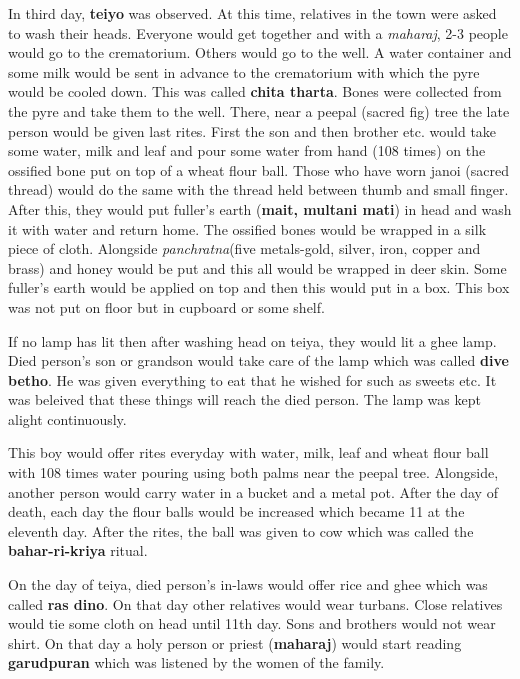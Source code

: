 In third day, \textbf{teiyo} was observed. At this time, relatives in the town
were asked to wash their heads. Everyone would get together and with a
\textit{maharaj}, 2-3 people would go to the crematorium. Others would go to
the well. A water container and some milk would be sent in advance to the
crematorium with which the pyre would be cooled down. This was called
\textbf{chita tharta}. Bones were collected from the pyre and take them to the
well. There, near a peepal (sacred fig) tree the late person would be given
last rites. First the son and then brother etc. would take some water, milk and
leaf and pour some water from hand (108 times) on the ossified bone put on top
of a wheat flour ball. Those who have worn janoi (sacred thread) would do the
same with the thread held between thumb and small finger. After this, they
would put fuller's earth (\textbf{mait, multani mati}) in head and wash it with
water and return home. The ossified bones would be wrapped in a silk piece of
cloth. Alongside \textit{panchratna}(five metals-gold, silver, iron, copper and
brass) and honey would be put and this all would be wrapped in deer skin. Some
fuller's earth would be applied on top and then this would put in a box. This
box was not put on floor but in cupboard or some shelf.

If no lamp has lit then after washing head on teiya, they would lit a ghee
lamp. Died person's son or grandson would take care of the lamp which was
called \textbf{dive betho}. He was given everything to eat that he wished for
such as sweets etc. It was beleived that these things will reach the died
person. The lamp was kept alight continuously. 

This boy would offer rites everyday with water, milk, leaf and wheat flour ball
with 108 times water pouring using both palms near the peepal tree. Alongside,
another person would carry water in a bucket and a metal pot. After the day of
death, each day the flour balls would be increased which became 11 at the
eleventh day. After the rites, the ball was given to cow which was called the
\textbf{bahar-ri-kriya} ritual.

On the day of teiya, died person's in-laws would offer rice and ghee which was
called \textbf{ras dino}. On that day other relatives would wear turbans. Close
relatives would tie some cloth on head until 11th day. Sons and brothers would
not wear shirt. On that day a holy person or priest (\textbf{maharaj}) would
start reading \textbf{garudpuran} which was listened by the women of the
family. 

